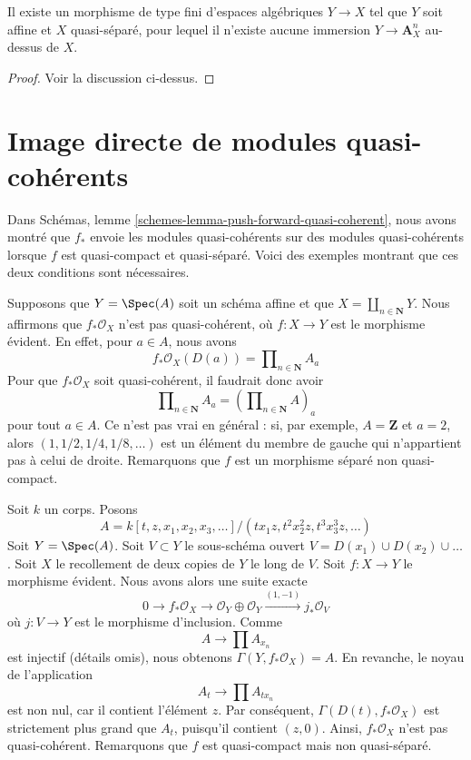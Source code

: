 \begin{lemma}
\label{lemma-cannot-embed-into-affine}
Il existe un morphisme de type fini d'espaces algébriques $Y \to X$
tel que $Y$ soit affine et $X$ quasi-séparé, pour lequel il n'existe
aucune immersion $Y \to \mathbf{A}^n_X$ au-dessus de $X$.
\end{lemma}

\begin{proof}
Voir la discussion ci-dessus.
\end{proof}










\section{Image directe de modules quasi-cohérents}
\label{section-push-quasi-coherent}

\noindent
Dans Schémas, lemme \ref{schemes-lemma-push-forward-quasi-coherent},
nous avons montré que $f_*$ envoie les modules quasi-cohérents sur des modules
quasi-cohérents lorsque $f$ est quasi-compact et quasi-séparé. Voici des
exemples montrant que ces deux conditions sont nécessaires.

\medskip\noindent
Supposons que $Y = \Spec(A)$ soit un schéma affine et que
$X = \coprod_{n \in \mathbf{N}} Y$. Nous affirmons que $f_*\mathcal{O}_X$
n'est pas quasi-cohérent, où $f : X \to Y$ est le morphisme évident.
En effet, pour $a \in A$, nous avons
$$
f_*\mathcal{O}_X(D(a)) = \prod\nolimits_{n \in \mathbf{N}} A_a
$$
Pour que $f_*\mathcal{O}_X$ soit quasi-cohérent, il faudrait donc avoir
$$
\prod\nolimits_{n \in \mathbf{N}} A_a
=
\left(\prod\nolimits_{n \in \mathbf{N}} A\right)_a
$$
pour tout $a \in A$. Ce n'est pas vrai en général : si, par exemple,
$A = \mathbf{Z}$ et $a = 2$, alors $(1, 1/2, 1/4, 1/8, \ldots)$
est un élément du membre de gauche qui n'appartient pas à celui de droite.
Remarquons que $f$ est un morphisme séparé non quasi-compact.

\medskip\noindent
Soit $k$ un corps. Posons
$$
A = k[t, z, x_1, x_2, x_3, \ldots]/(tx_1z, t^2x_2^2z, t^3x_3^3z, \ldots)
$$
Soit $Y = \Spec(A)$. Soit $V \subset Y$ le sous-schéma ouvert
$V = D(x_1) \cup D(x_2) \cup \ldots$. Soit $X$ le recollement de deux copies de $Y$
le long de $V$. Soit $f : X \to Y$ le morphisme évident. Nous avons alors
une suite exacte
$$
0 \to f_*\mathcal{O}_X \to
\mathcal{O}_Y \oplus \mathcal{O}_Y \xrightarrow{(1, -1)} j_*\mathcal{O}_V
$$
où $j : V \to Y$ est le morphisme d'inclusion. Comme
$$
A \longrightarrow \prod A_{x_n}
$$
est injectif (détails omis), nous obtenons $\Gamma(Y, f_*\mathcal{O}_X) = A$.
En revanche, le noyau de l'application
$$
A_t \longrightarrow \prod A_{tx_n}
$$
est non nul, car il contient l'élément $z$. Par conséquent,
$\Gamma(D(t), f_*\mathcal{O}_X)$ est strictement plus grand que
$A_t$, puisqu'il contient $(z, 0)$. Ainsi, $f_*\mathcal{O}_X$
n'est pas quasi-cohérent. Remarquons que $f$ est quasi-compact mais
non quasi-séparé.

